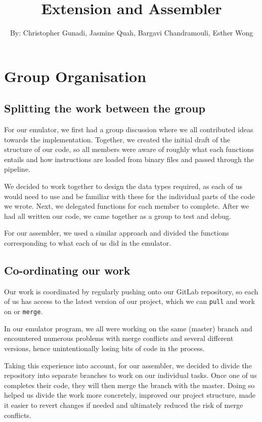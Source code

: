 \documentclass[11pt]{article}
\begin{document}
 
\title{Extension and Assembler} 
\author{By: Christopher Gunadi, Jasmine Quah, Bargavi Chandramouli, Esther Wong} 
\maketitle 

\section{Group Organisation}

\subsection{Splitting the work between the group}

For our emulator, we first had a group discussion where we all contributed ideas towards the implementation. Together, we created the initial draft of the structure of our code, so all members were aware of roughly what each functions entails and how instructions are loaded from binary files and passed through the pipeline.

We decided to work together to design the data types required, as each of us would need to use and be familiar with these for the individual parts of the code we wrote. Next, we delegated functions for each member to complete. After we had all written our code, we came together as a group to test and debug.

For our assembler, we used a similar approach and divided the functions corresponding to what each of us did in the emulator.

\subsection{Co-ordinating our work}

Our work is coordinated by regularly pushing onto our GitLab repository, so each of us has access to the latest version of our project, which we can \texttt{pull} and work on or \texttt{merge}.

In our emulator program, we all were working on the same (master) branch and encountered numerous problems with merge conflicts and several different versions, hence unintentionally losing bits of code in the process. 

Taking this experience into account, for our assembler, we decided to divide the repository into separate branches to work on our individual tasks. Once one of us completes their code, they will then merge the branch with the master. Doing so helped us divide the work more concretely, improved our project structure, made it easier to revert changes if needed and ultimately reduced the risk of merge conflicts.
\end{document}
